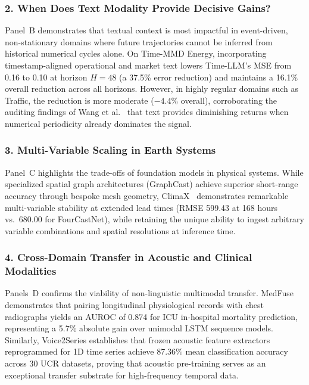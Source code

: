 \subsubsection{2. When Does Text Modality Provide Decisive Gains?}
Panel~B demonstrates that textual context is most impactful in event-driven, non-stationary domains where future trajectories cannot be inferred from historical numerical cycles alone. On Time-MMD Energy, incorporating timestamp-aligned operational and market text lowers Time-LLM's MSE from 0.16 to 0.10 at horizon $H=48$ (a 37.5\% error reduction) and maintains a 16.1\% overall reduction across all horizons. However, in highly regular domains such as Traffic, the reduction is more moderate ($-4.4\%$ overall), corroborating the auditing findings of Wang et al.~\cite{Wang2026AuditingText} that text provides diminishing returns when numerical periodicity already dominates the signal.

\subsubsection{3. Multi-Variable Scaling in Earth Systems}
Panel~C highlights the trade-offs of foundation models in physical systems. While specialized spatial graph architectures (GraphCast) achieve superior short-range accuracy through bespoke mesh geometry, ClimaX~\cite{Nguyen2023ClimaX} demonstrates remarkable multi-variable stability at extended lead times (RMSE 599.43 at 168 hours vs.\ 680.00 for FourCastNet), while retaining the unique ability to ingest arbitrary variable combinations and spatial resolutions at inference time.

\subsubsection{4. Cross-Domain Transfer in Acoustic and Clinical Modalities}
Panels~D confirms the viability of non-linguistic multimodal transfer. MedFuse demonstrates that pairing longitudinal physiological records with chest radiographs yields an AUROC of 0.874 for ICU in-hospital mortality prediction, representing a 5.7\% absolute gain over unimodal LSTM sequence models. Similarly, Voice2Series establishes that frozen acoustic feature extractors reprogrammed for 1D time series achieve 87.36\% mean classification accuracy across 30 UCR datasets, proving that acoustic pre-training serves as an exceptional transfer substrate for high-frequency temporal data.

